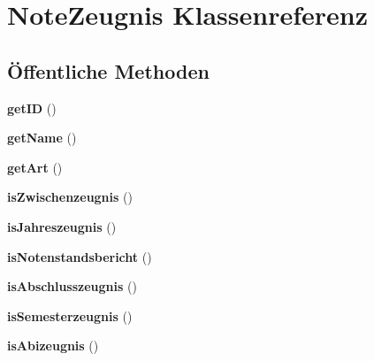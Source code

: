 \hypertarget{class_note_zeugnis}{}\section{Note\+Zeugnis Klassenreferenz}
\label{class_note_zeugnis}
\subsection*{Öffentliche Methoden}
\begin{DoxyCompactItemize}
\item 
\mbox{\label{class_note_zeugnis_a99ac076fe9685a11e050bb3c04b864d0}} 
{\bfseries get\+ID} ()
\item 
\mbox{\label{class_note_zeugnis_a906e87e66db9d9adf07102f636574c08}} 
{\bfseries get\+Name} ()
\item 
\mbox{\label{class_note_zeugnis_a07c9413c65040da13b068af3103310b8}} 
{\bfseries get\+Art} ()
\item 
\mbox{\label{class_note_zeugnis_a40a7a0dfc2a69187d39a916bde8fa256}} 
{\bfseries is\+Zwischenzeugnis} ()
\item 
\mbox{\label{class_note_zeugnis_ae496205523a350ff8d21c2f2d6f7c529}} 
{\bfseries is\+Jahreszeugnis} ()
\item 
\mbox{\label{class_note_zeugnis_a8af05ed913b6bc52fa4fd3b938c14e10}} 
{\bfseries is\+Notenstandsbericht} ()
\item 
\mbox{\label{class_note_zeugnis_a820462dece44044bcc14e4c0a9f798e6}} 
{\bfseries is\+Abschlusszeugnis} ()
\item 
\mbox{\label{class_note_zeugnis_a4057f1c32a3c001d6fcaf911dab1db48}} 
{\bfseries is\+Semesterzeugnis} ()
\item 
\mbox{\label{class_note_zeugnis_a0cf036452d2db5d8650dbf5875205250}} 
{\bfseries is\+Abizeugnis} ()
\item 
\mbox{\label{class_note_zeugnis_aa78d1d8ef1a1e076546bf3ba93333ccf}} 

\end{DoxyCompactItemize}
